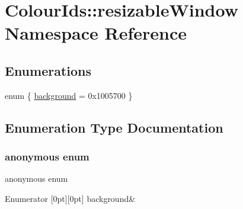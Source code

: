 \hypertarget{namespaceColourIds_1_1resizableWindow}{}\section{Colour\+Ids\+:\+:resizable\+Window Namespace Reference}
\label{namespaceColourIds_1_1resizableWindow}
\subsection*{Enumerations}
\begin{DoxyCompactItemize}
\item 
enum \{ \mbox{\hyperlink{namespaceColourIds_1_1resizableWindow_a52cbf0f29485a24c8d0567f00752490ea241ec950ce50c7eaec8fa88b1a89a6c7}{background}} = 0x1005700
 \}
\end{DoxyCompactItemize}


\subsection{Enumeration Type Documentation}
\mbox{\label{namespaceColourIds_1_1resizableWindow_a52cbf0f29485a24c8d0567f00752490e}} 
\subsubsection{\texorpdfstring{anonymous enum}{anonymous enum}}
{\footnotesize\ttfamily anonymous enum}

\begin{DoxyEnumFields}{Enumerator}
[0pt][0pt]{}\mbox{\label{namespaceColourIds_1_1resizableWindow_a52cbf0f29485a24c8d0567f00752490ea241ec950ce50c7eaec8fa88b1a89a6c7}} 
background&\\
\hline

\end{DoxyEnumFields}
